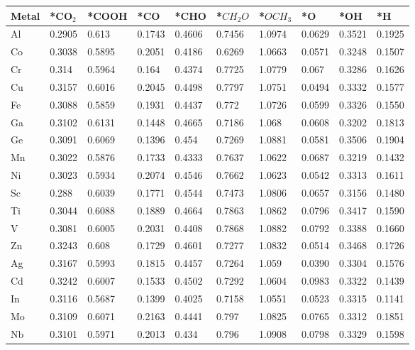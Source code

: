 \begin{table}[h]
  \centering
  {\fontsize{6}{12}\selectfont
  \begin{tabular}{*{10}{l}}
    \hline
    Metal & *CO$_2$ & *COOH & *CO & *CHO & *$CH_2O$ & *$OCH_3$ & *O & *OH & *H \\
    \hline
    Al & 0.2905 & 0.613  & 0.1743 & 0.4606 & 0.7456 & 1.0974 & 0.0629 & 0.3521 & 0.1925 \\
    Co & 0.3038 & 0.5895 & 0.2051 & 0.4186 & 0.6269 & 1.0663 & 0.0571 & 0.3248 & 0.1507 \\
    Cr & 0.314  & 0.5964 & 0.164  & 0.4374 & 0.7725 & 1.0779 & 0.067  & 0.3286 & 0.1626 \\
    Cu & 0.3157 & 0.6016 & 0.2045 & 0.4498 & 0.7797 & 1.0751 & 0.0494 & 0.3332 & 0.1577 \\
    Fe & 0.3088 & 0.5859 & 0.1931 & 0.4437 & 0.772  & 1.0726 & 0.0599 & 0.3326 & 0.1550 \\
    Ga & 0.3102 & 0.6131 & 0.1448 & 0.4665 & 0.7186 & 1.068  & 0.0608 & 0.3202 & 0.1813 \\
    Ge & 0.3091 & 0.6069 & 0.1396 & 0.454  & 0.7269 & 1.0881 & 0.0581 & 0.3506 & 0.1904 \\
    Mn & 0.3022 & 0.5876 & 0.1733 & 0.4333 & 0.7637 & 1.0622 & 0.0687 & 0.3219 & 0.1432 \\
    Ni & 0.3023 & 0.5934 & 0.2074 & 0.4546 & 0.7662 & 1.0623 & 0.0542 & 0.3313 & 0.1611 \\
    Sc & 0.288  & 0.6039 & 0.1771 & 0.4544 & 0.7473 & 1.0806 & 0.0657 & 0.3156 & 0.1480 \\
    Ti & 0.3044 & 0.6088 & 0.1889 & 0.4664 & 0.7863 & 1.0862 & 0.0796 & 0.3417 & 0.1590 \\
    V  & 0.3081 & 0.6005 & 0.2031 & 0.4408 & 0.7868 & 1.0882 & 0.0792 & 0.3388 & 0.1660 \\
    Zn & 0.3243 & 0.608  & 0.1729 & 0.4601 & 0.7277 & 1.0832 & 0.0514 & 0.3468 & 0.1726 \\
    Ag & 0.3167 & 0.5993 & 0.1815 & 0.4457 & 0.7264 & 1.059  & 0.0390 & 0.3304 & 0.1576 \\
    Cd & 0.3242 & 0.6007 & 0.1533 & 0.4502 & 0.7292 & 1.0604 & 0.0983 & 0.3322 & 0.1439 \\
    In & 0.3116 & 0.5687 & 0.1399 & 0.4025 & 0.7158 & 1.0551 & 0.0523 & 0.3315 & 0.1141 \\
    Mo & 0.3109 & 0.6071 & 0.2163 & 0.4441 & 0.797  & 1.0825 & 0.0765 & 0.3312 & 0.1851 \\
    Nb & 0.3101 & 0.5971 & 0.2013 & 0.434  & 0.796  & 1.0908 & 0.0798 & 0.3329 & 0.1598 \\

\end{tabular}}
\end{table}
